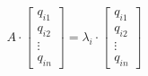 \documentclass[a4paper,twoside,justified]{tufte-handout}
\begin{document}
\begin{equation}
  A \cdot
  \begin{bmatrix}
    q_{i1}  \\
    q_{i2}  \\
    \vdots \\
    q_{in} 
  \end{bmatrix} =
  \lambda_{i} \cdot
  \begin{bmatrix}
    q_{i1}  \\
    q_{i2}  \\
    \vdots \\
    q_{in} 
  \end{bmatrix}
\end{equation}



\end{document}
